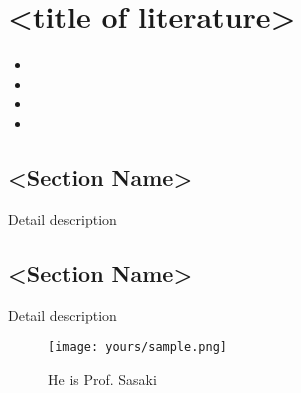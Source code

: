 \documentclass[../root]{subfiles}
\begin{document}
    \chapter{<title of literature>}

    \begin{shortsummary}
        \begin{itemize}
            \item {} %
            \item {}
            \item {}
            \item {}
        \end{itemize}
    \end{shortsummary}

    \section{<Section Name>}

    Detail description
    
    \section{<Section Name>}

    Detail description

    \begin{figure}
        \centering
        \texttt{[image: yours/sample.png]}
        \caption{He is Prof. Sasaki}
        \label{fig:my_label}
    \end{figure}

    \biblio
\end{document}
